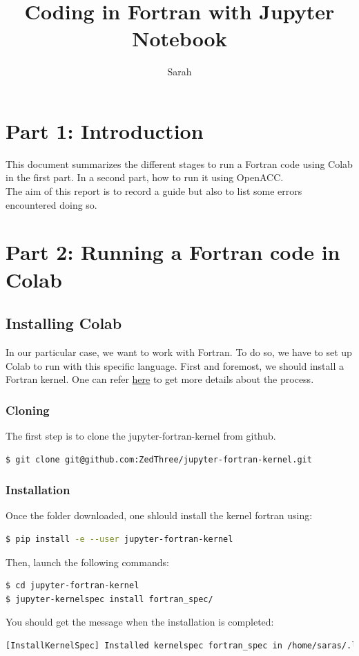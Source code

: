 \documentclass[10pt,a4paper]{article}
\author{Sarah}
\title{Coding in Fortran with Jupyter Notebook}
\begin{document}
\maketitle{}
\newpage

\section{Part 1: Introduction}
This document summarizes the different stages to run a Fortran code using Colab in the first part. In a second part, how to run it using OpenACC.\\
The aim of this report is to record a guide but also to list some errors encountered doing so.
\section{Part 2: Running a Fortran code in Colab}
\subsection{Installing Colab}
In our particular case, we want to work with Fortran. To do so, we have to set up Colab to run with this specific language.
First and foremost, we should install a Fortran kernel. One can refer \href{https://github.com/ZedThree/jupyter-fortran-kernel}{here} to get more details about the process.\\

\subsubsection{Cloning}
\noindent The first step is to clone the jupyter-fortran-kernel from github.
\begin{lstlisting}[language=bash]
$ git clone git@github.com:ZedThree/jupyter-fortran-kernel.git
\end{lstlisting}

\subsubsection{Installation}
Once the folder downloaded, one shlould install the kernel fortran using:
\begin{lstlisting}[language=bash]
$ pip install -e --user jupyter-fortran-kernel
\end{lstlisting}

\noindent Then, launch the following commands:
\begin{lstlisting}[language=bash]
$ cd jupyter-fortran-kernel
$ jupyter-kernelspec install fortran_spec/
\end{lstlisting}
You should get the message when the installation is completed:
\begin{lstlisting}[language=bash]
[InstallKernelSpec] Installed kernelspec fortran_spec in /home/saras/.local/share/jupyter/kernels/fortran_spec
\end{lstlisting}
\end{document}
